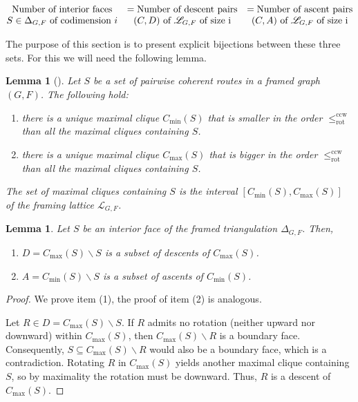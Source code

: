 \documentclass[12pt, reqno]{amsart}
\theoremstyle{plain}
\newtheorem{lemma}[theorem]{Lemma}
\theoremstyle{definition}
\numberwithin{equation}{section}
\newcommand\scrL{\mathscr{L}}
\newcommand\ccw{\mathrm{ccw}}
\begin{document}
\[
\begin{array}{@{}ccc@{}}
\text{Number of interior faces} 
& = \text{Number of descent pairs}
& = \text{Number of ascent pairs} \\
\text{$S\in\Delta_{G,F}$ of codimension $i$}
& \text{$(C,D)$ of $\scrL_{G,F}$ of size i}
& \text{$(C,A)$ of $\scrL_{G,F}$ of size i}
\end{array}
\]

\bigskip
\noindent
The purpose of this section is to present explicit bijections between these three sets. For this we will need the following lemma.

\begin{lemma}[{\cite[Corollary~1.2.20 and Corollary~1.2.22]{vonBell_framing_2024}}]
\label{lem_Cmin_Cmax}
    Let $S$ be a set of pairwise coherent routes in a framed graph $(G,F)$. The following hold:
    \begin{enumerate}
        \item there is a unique maximal clique $C_{\min}(S)$ that is smaller in the order $\leq_{\mathrm{rot}}^{\ccw}$ than all the maximal cliques containing $S$.
        \item there is a unique maximal clique $C_{\max}(S)$ that is bigger in the order $\leq_{\mathrm{rot}}^{\ccw}$ than all the maximal cliques containing $S$.
    \end{enumerate}
    The set of maximal cliques containing $S$ is the interval $[C_{\min}(S), C_{\max}(S)]$ of the framing lattice $\scrL_{G,F}$.
\end{lemma}

\begin{lemma}\label{lem_maps_well_defined}
    Let $S$ be an interior face of the framed triangulation $\Delta_{G,F}$. Then,
    \begin{enumerate}
        \item $D=C_{\max}(S)\smallsetminus S$ is a subset of descents of $C_{\max}(S)$.
        \item $A=C_{\min}(S)\smallsetminus S$ is a subset of ascents of $C_{\min}(S)$.
    \end{enumerate}
\end{lemma}
\begin{proof}
    We prove item (1), the proof of item (2) is analogous.
    
     Let $R \in D = C_{\max}(S) \smallsetminus S$. If $R$ admits no rotation (neither upward nor downward) within $C_{\max}(S)$, then $C_{\max}(S) \smallsetminus R$ is a boundary face. Consequently, $S \subseteq C_{\max}(S) \smallsetminus R$ would also be a boundary face, which is a contradiction. Rotating $R$ in $C_{\max}(S)$ yields another maximal clique containing $S$, so by maximality the rotation must be downward. Thus, $R$ is a descent of $C_{\max}(S)$.
\end{proof}
\end{document}
